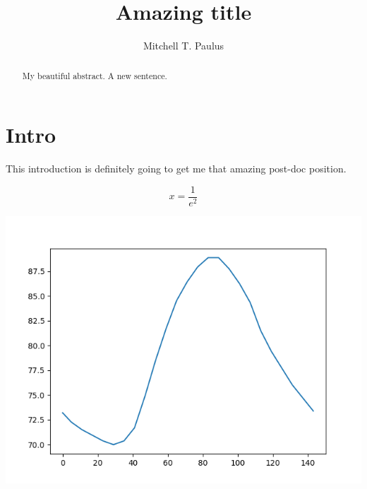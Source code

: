 \documentclass{article}
\author{Mitchell T. Paulus}
\title{Amazing title}
\begin{document}
\maketitle{}

\begin{abstract}
My beautiful abstract. A new sentence.
\end{abstract}

\section{Intro}

This introduction is definitely going to get me that amazing post-doc
position.

\begin{equation}
    x = \frac{1}{e^{2} }
\end{equation}

\includegraphics{eplusout.png}
\end{document}
